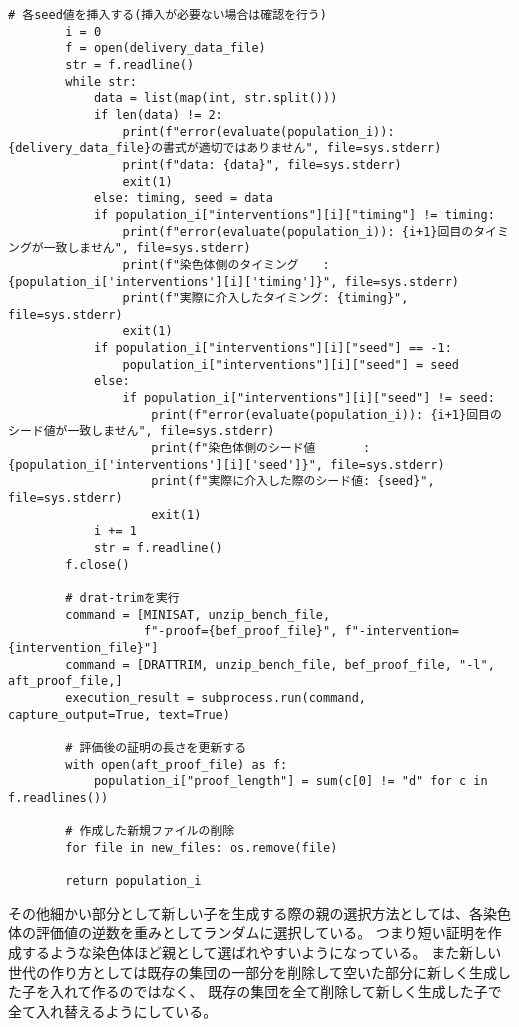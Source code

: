 \begin{lstlisting}[caption=評価関数evaluate]
        # 各seed値を挿入する(挿入が必要ない場合は確認を行う)
        i = 0
        f = open(delivery_data_file)
        str = f.readline()
        while str:
            data = list(map(int, str.split()))
            if len(data) != 2:
                print(f"error(evaluate(population_i)): {delivery_data_file}の書式が適切ではありません", file=sys.stderr)
                print(f"data: {data}", file=sys.stderr)
                exit(1)
            else: timing, seed = data
            if population_i["interventions"][i]["timing"] != timing:
                print(f"error(evaluate(population_i)): {i+1}回目のタイミングが一致しません", file=sys.stderr)
                print(f"染色体側のタイミング　　: {population_i['interventions'][i]['timing']}", file=sys.stderr)
                print(f"実際に介入したタイミング: {timing}", file=sys.stderr)
                exit(1)
            if population_i["interventions"][i]["seed"] == -1:
                population_i["interventions"][i]["seed"] = seed
            else:
                if population_i["interventions"][i]["seed"] != seed:
                    print(f"error(evaluate(population_i)): {i+1}回目のシード値が一致しません", file=sys.stderr)
                    print(f"染色体側のシード値　　　　: {population_i['interventions'][i]['seed']}", file=sys.stderr)
                    print(f"実際に介入した際のシード値: {seed}", file=sys.stderr)
                    exit(1)
            i += 1
            str = f.readline()
        f.close()

        # drat-trimを実行
        command = [MINISAT, unzip_bench_file,
                   f"-proof={bef_proof_file}", f"-intervention={intervention_file}"]
        command = [DRATTRIM, unzip_bench_file, bef_proof_file, "-l", aft_proof_file,]
        execution_result = subprocess.run(command, capture_output=True, text=True)

        # 評価後の証明の長さを更新する
        with open(aft_proof_file) as f:
            population_i["proof_length"] = sum(c[0] != "d" for c in f.readlines())

        # 作成した新規ファイルの削除
        for file in new_files: os.remove(file)

        return population_i
\end{lstlisting}



その他細かい部分として新しい子を生成する際の親の選択方法としては、各染色体の評価値の逆数を重みとしてランダムに選択している。
つまり短い証明を作成するような染色体ほど親として選ばれやすいようになっている。
また新しい世代の作り方としては既存の集団の一部分を削除して空いた部分に新しく生成した子を入れて作るのではなく、
既存の集団を全て削除して新しく生成した子で全て入れ替えるようにしている。

